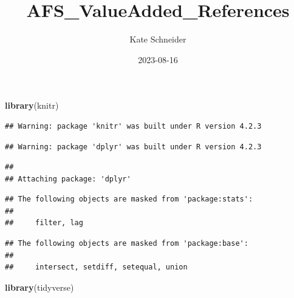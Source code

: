 \documentclass[
]{article}
\title{AFS\_ValueAdded\_References}
\author{Kate Schneider}
\date{2023-08-16}
\newenvironment{Shaded}{\begin{snugshade}}{\end{snugshade}}
\newcommand{\AttributeTok}[1]{\textcolor[rgb]{0.13,0.29,0.53}{#1}}
\newcommand{\CommentTok}[1]{\textcolor[rgb]{0.56,0.35,0.01}{\textit{#1}}}
\newcommand{\ConstantTok}[1]{\textcolor[rgb]{0.56,0.35,0.01}{#1}}
\newcommand{\FunctionTok}[1]{\textcolor[rgb]{0.13,0.29,0.53}{\textbf{#1}}}
\newcommand{\NormalTok}[1]{#1}
\newcommand{\SpecialCharTok}[1]{\textcolor[rgb]{0.81,0.36,0.00}{\textbf{#1}}}
\newcommand{\StringTok}[1]{\textcolor[rgb]{0.31,0.60,0.02}{#1}}
\begin{document}
\maketitle

\begin{Shaded}
\begin{Highlighting}[]
\FunctionTok{library}\NormalTok{(knitr)}
\end{Highlighting}
\end{Shaded}

\begin{verbatim}
## Warning: package 'knitr' was built under R version 4.2.3
\end{verbatim}

\begin{Shaded}
\end{Shaded}

\begin{verbatim}
## Warning: package 'dplyr' was built under R version 4.2.3
\end{verbatim}

\begin{verbatim}
## 
## Attaching package: 'dplyr'
\end{verbatim}

\begin{verbatim}
## The following objects are masked from 'package:stats':
## 
##     filter, lag
\end{verbatim}

\begin{verbatim}
## The following objects are masked from 'package:base':
## 
##     intersect, setdiff, setequal, union
\end{verbatim}

\begin{Shaded}
\begin{Highlighting}[]
\FunctionTok{library}\NormalTok{(tidyverse)}
\end{Highlighting}
\end{Shaded}
\end{document}
